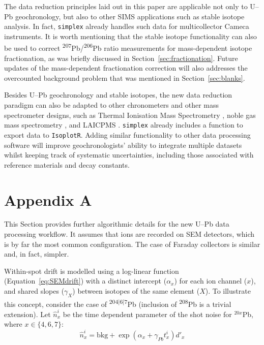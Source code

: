 \documentclass{article}
\begin{document}
The data reduction principles laid out in this paper are applicable
not only to U--Pb geochronology, but also to other SIMS applications
such as stable isotope analysis.  In fact, \texttt{simplex} already
handles such data for multicollector Cameca instruments.  It is worth
mentioning that the stable isotope functionality can also be used to
correct \textsuperscript{207}Pb/\textsuperscript{206}Pb ratio
measurements for mass-dependent isotope fractionation, as was briefly
discussed in Section~\ref{sec:fractionation}. Future updates of the
mass-dependent fractionation correction will also addresses the
overcounted background problem that was mentioned in
Section~\ref{sec:blanks}.\medskip

Besides U--Pb geochronology and stable isotopes, the new data
reduction paradigm can also be adapted to other chronometers and other
mass spectrometer designs, such as Thermal Ionisation Mass
Spectrometry \citep[TIMS,][]{connelly2021}, noble gas mass
spectrometry \citep{vermeesch2015b}, and LAICPMS \citep{mclean2016}.
\texttt{simplex} already includes a function to export data to
\texttt{IsoplotR}.  Adding similar functionality to other data
processing software will improve geochronologists' ability to
integrate multiple datasets whilst keeping track of systematic
uncertainties, including those associated with reference materials and
decay constants.

\section*{Appendix A}    %

This Section provides further algorithmic details for the new U--Pb
data processing workflow. It assumes that ions are recorded on SEM
detectors, which is by far the most common configuration. The case of
Faraday collectors is similar and, in fact, simpler.\medskip

Within-spot drift is modelled using a log-linear function
(Equation~\ref{eq:SEMdrift}) with a distinct intercept ($\alpha_x$)
for each ion channel ($x$), and shared slopes ($\gamma_X$) between
isotopes of the same element ($X$). To illustrate this concept,
consider the case of \textsuperscript{$204|6|7$}Pb (inclusion of
\textsuperscript{208}Pb is a trivial extension). Let $\hat{n}^i_x$ be
the time dependent parameter of the shot noise for ${}^{20x}$Pb, where
$x\in\{4,6,7\}$:
\begin{equation}
  \hat{n}^i_x = \mbox{bkg} + \exp(\alpha_x + \gamma_{Pb}t^i_x) d'_x
\end{equation}
\end{document}
